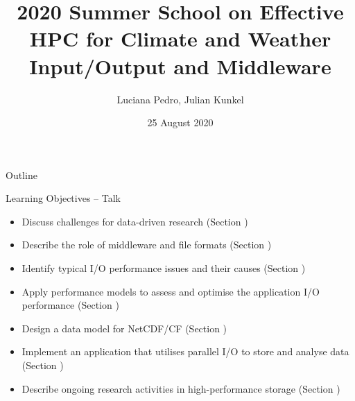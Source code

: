 \documentclass[compress,11pt,xcolor=svgnames,aspectratio=169]{beamer}
\title[Input/Output and Middleware -- Talk Session]{2020 Summer School on Effective HPC for Climate and Weather \\[0.5cm] Input/Output and Middleware}
\author[Pedro, Kunkel]{Luciana Pedro, Julian Kunkel
}
\institute[WP4 Team]{Department of Computer Science, University of Reading}
\date{25 August 2020}
\begin{document}
\begin{frame}[plain]
    \titlepage
\end{frame}

\begin{withoutheadline}
\begin{frame}{Outline}
    \begin{centering}
    {\tiny
    \tableofcontents[hideallsubsections]
    }
    \end{centering}
    \disclaimer
\end{frame}
\end{withoutheadline}


\begin{frame}[fragile]{Learning Objectives -- Talk}

{\footnotesize

\begin{itemize}
\setlength\itemsep{0.4cm}
  \item Discuss challenges for data-driven research (Section )
  \item Describe the role of middleware and file formats (Section )
  \item Identify typical I/O performance issues and their causes (Section )
  \item Apply performance models to assess and optimise the application I/O performance (Section )
  \item Design a data model for NetCDF/CF (Section )
  \item Implement an application that utilises parallel I/O to store and analyse data (Section )
  \item Describe ongoing research activities in high-performance storage (Section )
\end{itemize}

}

\end{frame}
\end{document}
